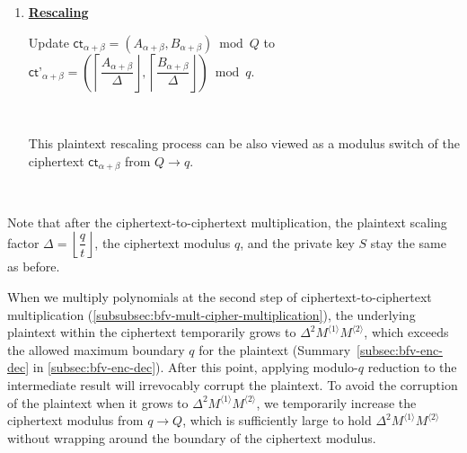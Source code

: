 \begin{tcolorbox}[title={\textbf{\tboxlabel{\ref*{subsubsec:bfv-mult-cipher-summary}} BFV's Ciphertext-to-Ciphertext Multiplication}}]
\begin{enumerate}
$ \textsf{ct}_\alpha = (D
_1, D_0)$

$ \textsf{ct}_\beta = \bm{\langle} \textsf{Decomp}^{\beta, l}(D_2), \text{ } \textsf{RLev}_{S, \sigma}^{\beta, l}( S^2) \bm{\rangle}$.

$ \textsf{ct}_{\alpha + \beta} = \textsf{ct}_{\alpha} + \textsf{ct}_{\beta}$

$ $

Then, the following property holds: 

$\textsf{RLWE}^{-1}_{S, \sigma}\bm(\textsf{RLWE}_{S, \sigma}(\Delta^2 \cdot M^{\langle 1 \rangle} \cdot M^{\langle 2 \rangle})\bm) \approx \textsf{RLWE}^{-1}_{S, \sigma}\bm{(}\textsf{ct}_{\alpha + \beta}\bm)$

$ $




\item \textbf{\underline{Rescaling}}

Update $\textsf{ct}_{\alpha + \beta} = (A_{\alpha + \beta}, B_{\alpha + \beta}) \bmod Q$ to $\textsf{ct'}_{\alpha + \beta} = \left(\left\lceil\dfrac{A_{\alpha + \beta}}{\Delta}\right\rfloor, \left\lceil\dfrac{B_{\alpha + \beta}}{\Delta}\right\rfloor\right) \bmod q$. 

$ $

This plaintext rescaling process can be also viewed as a modulus switch of the ciphertext $\textsf{ct}_{\alpha + \beta}$ from $Q \rightarrow q$. 


$ $

\end{enumerate}

Note that after the ciphertext-to-ciphertext multiplication, the plaintext scaling factor $\Delta=\left\lfloor\dfrac{q}{t}\right\rfloor$, the ciphertext modulus $q$, and the private key $S$ stay the same as before.



\end{tcolorbox}


 When we multiply polynomials at the second step of ciphertext-to-ciphertext multiplication (\autoref{subsubsec:bfv-mult-cipher-multiplication}), the underlying plaintext within the ciphertext temporarily grows to $\Delta^2 M^{\langle 1 \rangle} M^{\langle 2 \rangle}$, which exceeds the allowed maximum boundary $q$ for the plaintext (Summary~\ref*{subsec:bfv-enc-dec} in \autoref{subsec:bfv-enc-dec}). After this point, applying modulo-$q$ reduction to the intermediate result will irrevocably corrupt the plaintext. To avoid the corruption of the plaintext when it grows to $\Delta^2 M^{\langle 1 \rangle} M^{\langle 2 \rangle}$, we temporarily increase the ciphertext modulus from $q \rightarrow Q$, which is sufficiently large to hold $\Delta^2 M^{\langle 1 \rangle} M^{\langle 2 \rangle}$ without wrapping around the boundary of the ciphertext modulus. 

